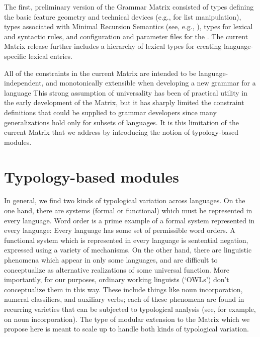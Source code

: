 The first, preliminary version of the Grammar Matrix 
consisted of types defining the basic feature geometry and technical
devices (e.g., for list manipulation), types associated with Minimal
Recursion Semantics (see, e.g., \cite{Cop:Las:Fli:01}), types for
lexical and syntactic rules, and configuration and parameter
files for the \lkb.  The current Matrix release further 
includes a hierarchy of lexical types for creating language-specific 
lexical entries.

All of the constraints in the current Matrix are intended to be 
language-independent, and monotonically extensible when developing a
new grammar for a language
This strong 
assumption of universality has been of practical utility in the early
development of the Matrix, but it has sharply limited the 
constraint definitions that could be supplied to grammar developers
since many generalizations hold only for subsets of languages.  It is
this limitation of the current Matrix that we address by introducing
the notion of typology-based modules.

\section{Typology-based modules}

In general, we find two kinds of typological variation across
languages.  On the one hand, there are systems (formal or functional)
which must be represented in every language.  Word order is a prime
example of a formal system represented in every language: Every
language has some set of permissible word orders.
A functional system which is represented in every language is
sentential negation, expressed using a variety of mechanisms.  On 
the other hand, there are linguistic
phenomena which appear in only some languages, and are difficult to
conceptualize as alternative realizations of some universal function.  More
importantly, for our purposes, ordinary working linguists (`OWLs')
don't conceptualize them in this way.  These include things like
noun incorporation, numeral classifiers, and auxiliary verbs; each of
these phenomena are found in recurring varieties that can be 
subjected to typological
analysis (see, for example, \cite{Mithun:84} on noun incorporation).
The type of modular extension to the Matrix which we propose here
is meant to scale up to handle both kinds of typological variation.

